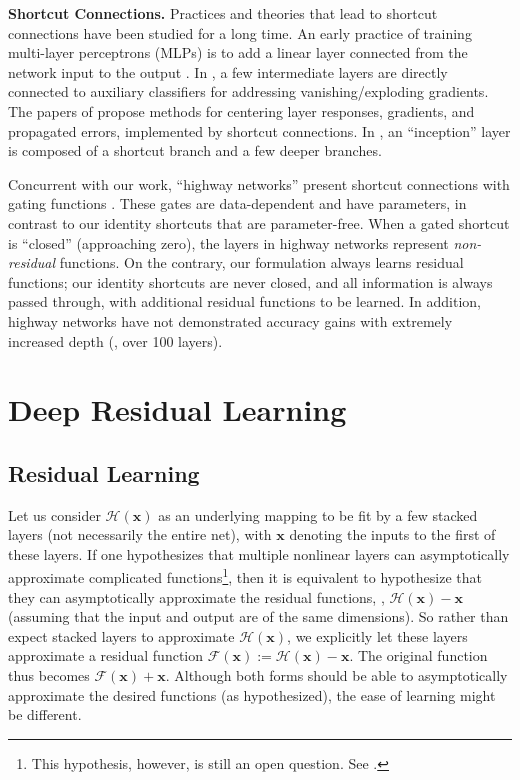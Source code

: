 \documentclass[10pt,twocolumn,letterpaper]{article}
\newcommand{\ve}[1]{\mathbf{#1}} %
\begin{document}
\vspace{6pt}
\noindent\textbf{Shortcut Connections.}
Practices and theories that lead to shortcut connections \cite{Bishop1995,Ripley1996,Venables1999} have been studied for a long time.
An early practice of training multi-layer perceptrons (MLPs) is to add a linear layer connected from the network input to the output \cite{Ripley1996,Venables1999}. In \cite{Szegedy2015,Lee2014}, a few intermediate layers are directly connected to auxiliary classifiers for addressing vanishing/exploding gradients. The papers of \cite{Schraudolph1998,Schraudolph1998a,Raiko2012,Vatanen2013} propose methods for centering layer responses, gradients, and propagated errors, implemented by shortcut connections. In \cite{Szegedy2015}, an ``inception'' layer is composed of a shortcut branch and a few deeper branches.


Concurrent with our work, ``highway networks'' \cite{Srivastava2015,Srivastava2015a} present shortcut connections with gating functions \cite{Hochreiter1997}. These gates are data-dependent and have parameters, in contrast to our identity shortcuts that are parameter-free. When a gated shortcut is ``closed'' (approaching zero), the layers in highway networks represent \emph{non-residual} functions. On the contrary, our formulation always learns residual functions; our identity shortcuts are never closed, and all information is always passed through, with additional residual functions to be learned. In addition, highway networks have not demonstrated accuracy gains with extremely increased depth (\eg, over 100 layers).

\section{Deep Residual Learning}

\subsection{Residual Learning}
\label{sec:motivation}

Let us consider $\mathcal{H}(\ve{x})$ as an underlying mapping to be fit by a few stacked layers (not necessarily the entire net), with $\ve{x}$ denoting the inputs to the first of these layers. If one hypothesizes that multiple nonlinear layers can asymptotically approximate complicated functions\footnote{This hypothesis, however, is still an open question. See \cite{Montufar2014}.}, then it is equivalent to hypothesize that they can asymptotically approximate the residual functions, \ie, $\mathcal{H}(\ve{x})-\ve{x}$ (assuming that the input and output are of the same dimensions).
So rather than expect stacked layers to approximate $\mathcal{H}(\ve{x})$, we explicitly let these layers approximate a residual function $\mathcal{F}(\ve{x}):=\mathcal{H}(\ve{x})-\ve{x}$. The original function thus becomes $\mathcal{F}(\ve{x})+\ve{x}$. Although both forms should be able to asymptotically approximate the desired functions (as hypothesized), the ease of learning might be different.
\end{document}
